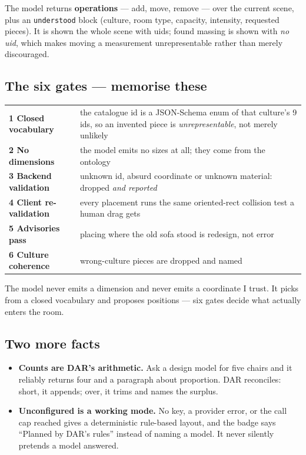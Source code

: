 \documentclass[10.5pt,a4paper]{article}
\begin{document}
The model returns \textbf{operations} --- add, move, remove --- over the current scene, plus an
\texttt{understood} block (culture, room type, capacity, intensity, requested pieces). It is shown
the whole scene with uids; found massing is shown with \emph{no uid}, which makes moving a
measurement unrepresentable rather than merely discouraged.

\subsection*{The six gates --- memorise these}
\begin{tabularx}{\linewidth}{@{}lX@{}}
\toprule
\textbf{1 Closed vocabulary} & the catalogue id is a JSON-Schema enum of that culture's 9 ids, so an
  invented piece is \emph{unrepresentable}, not merely unlikely\\
\textbf{2 No dimensions} & the model emits no sizes at all; they come from the ontology\\
\textbf{3 Backend validation} & unknown id, absurd coordinate or unknown material: dropped
  \emph{and reported}\\
\textbf{4 Client re-validation} & every placement runs the same oriented-rect collision test a human
  drag gets\\
\textbf{5 Advisories pass} & placing where the old sofa stood is redesign, not error\\
\textbf{6 Culture coherence} & wrong-culture pieces are dropped and named\\
\bottomrule
\end{tabularx}

\begin{sayit}
The model never emits a dimension and never emits a coordinate I trust. It picks from a closed
vocabulary and proposes positions --- six gates decide what actually enters the room.
\end{sayit}

\subsection*{Two more facts}
\begin{itemize}[leftmargin=1.1em,itemsep=1pt]
  \item \textbf{Counts are DAR's arithmetic.} Ask a design model for five chairs and it reliably
        returns four and a paragraph about proportion. DAR reconciles: short, it appends; over, it
        trims and names the surplus.
  \item \textbf{Unconfigured is a working mode.} No key, a provider error, or the call cap reached
        gives a deterministic rule-based layout, and the badge says ``Planned by DAR's rules''
        instead of naming a model. It never silently pretends a model answered.
\end{itemize}
\end{document}

